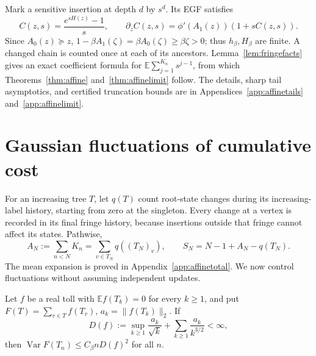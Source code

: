 \documentclass[runningheads,envcountsame,orivec]{llncs}
\newcommand{\E}{\mathbb E}
\begin{document}
Mark a sensitive insertion at depth $d$ by $s^d$. Its EGF satisfies
\begin{equation}\label{eq:affinemarked}
 C(z,s)=\frac{e^{sH(z)}-1}{s},\qquad
 \partial_z C(z,s)=\phi'(A_1(z))(1+sC(z,s)).
\end{equation}
Since $A_0(z)\succeq z$,
$1-\beta A_1(\zeta)=\beta A_0(\zeta)\ge\beta\zeta>0$;
thus $h_\beta,H_\beta$ are finite. A changed chain is counted once
at each of its ancestors. Lemma~\ref{lem:fringefacts} gives an exact
coefficient formula for $\E\sum_{j=1}^{K_n}s^{j-1}$, from which
Theorems~\ref{thm:affine} and~\ref{thm:affinelimit} follow.
The details, sharp tail asymptotics, and certified truncation bounds
are in Appendices~\ref{app:affinetails} and~\ref{app:affinelimit}.

\section{Gaussian fluctuations of cumulative cost}\label{sec:clt}

For an increasing tree $T$, let $q(T)$ count root-state changes
during its increasing-label history, starting from zero at the
singleton. Every change at a vertex is recorded in its final fringe
history, because insertions outside that fringe cannot affect its
states. Pathwise,
\begin{equation}\label{eq:historyidentity}
 A_N:=\sum_{n<N}K_n=\sum_{v\in T_N}q((T_N)_v),\qquad
 S_N=N-1+A_N-q(T_N).
\end{equation}
The mean expansion is proved in Appendix~\ref{app:affinetotal}.
We now control fluctuations without assuming independent updates.
\begin{lemma}\label{lem:centeredtollvariance}
Let $f$ be a real toll with $\E f(T_k)=0$ for every $k\ge1$,
and put $F(T)=\sum_{v\in T}f(T_v)$,
$a_k=\|f(T_k)\|_2$. If
\[
 D(f):=\sup_{k\ge1}\frac{a_k}{\sqrt k}
       +\sum_{k\ge1}\frac{a_k}{k^{3/2}}<\infty,
\]
then $\operatorname{Var}F(T_n)\le C_\beta n D(f)^2$ for all $n$.
\end{lemma}
\end{document}
